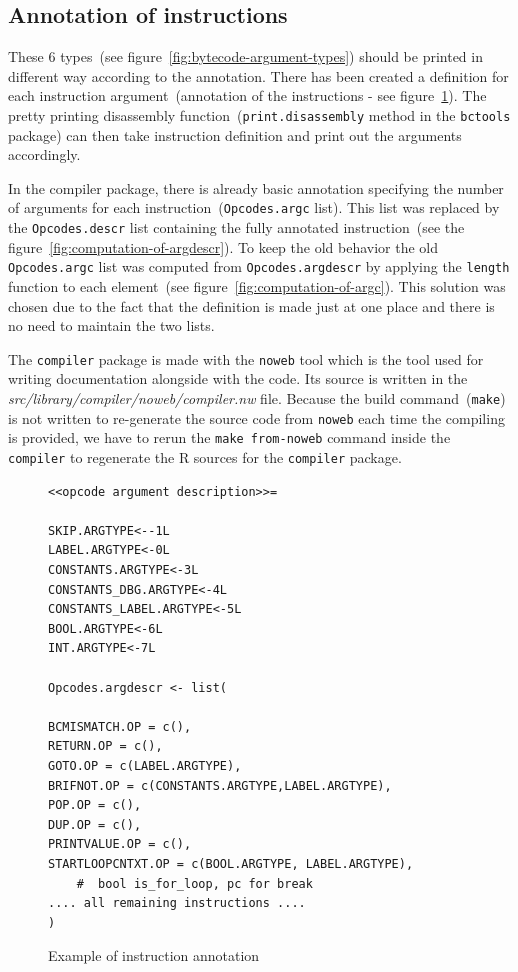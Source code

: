 \documentclass[thesis=M,english]{FITthesis}[2018/10/20]
\newcommand{\code}[1]{\texttt{#1}}
\begin{document}
\subsection{Annotation of instructions}\label{annotation-of-instructions}
These 6 types~(see figure~\ref{fig:bytecode-argument-types}) should be printed in different way according to the annotation. There has been created a definition for each instruction argument~(annotation of the instructions - see figure~\ref{fig:instruction-annotation-example}). The pretty printing disassembly function~(\code{print.disassembly} method in the \code{bctools} package) can then take instruction definition and print out the arguments accordingly.

In the compiler package, there is already basic annotation specifying the number of arguments for each instruction~(\code{Opcodes.argc} list). This list was replaced by the \code{Opcodes.descr} list containing the fully annotated instruction~(see the figure~\ref{fig:computation-of-argdescr}). To keep the old behavior the old \code{Opcodes.argc} list was computed from \code{Opcodes.argdescr} by applying the \code{length} function to each element~(see figure~\ref{fig:computation-of-argc}). This solution was chosen due to the fact that the definition is made just at one place and there is no need to maintain the two lists.

The \code{compiler} package is made with the \code{noweb} tool which is the tool used for writing documentation alongside with the code. Its source is written in the \textit{src/library/compiler/noweb/compiler.nw} file. Because the build command~(\code{make}) is not written to re-generate the source code from \code{noweb} each time the compiling is provided, we have to rerun the \code{make from-noweb} command inside the \code{compiler} to regenerate the R sources for the \code{compiler} package.

\begin{figure}[H]
\begin{lstlisting}
<<opcode argument description>>=

SKIP.ARGTYPE<--1L
LABEL.ARGTYPE<-0L
CONSTANTS.ARGTYPE<-3L
CONSTANTS_DBG.ARGTYPE<-4L
CONSTANTS_LABEL.ARGTYPE<-5L
BOOL.ARGTYPE<-6L
INT.ARGTYPE<-7L

Opcodes.argdescr <- list(

BCMISMATCH.OP = c(),
RETURN.OP = c(),
GOTO.OP = c(LABEL.ARGTYPE),
BRIFNOT.OP = c(CONSTANTS.ARGTYPE,LABEL.ARGTYPE),
POP.OP = c(),
DUP.OP = c(),
PRINTVALUE.OP = c(),
STARTLOOPCNTXT.OP = c(BOOL.ARGTYPE, LABEL.ARGTYPE),
    #  bool is_for_loop, pc for break
.... all remaining instructions ....
)
\end{lstlisting}
	\caption{Example of instruction annotation}\label{fig:instruction-annotation-example}
\end{figure}
\end{document}
